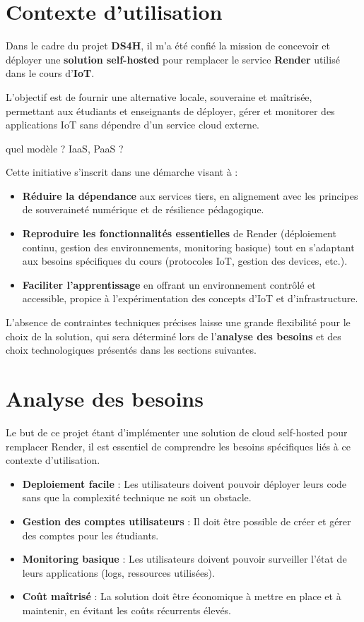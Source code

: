 \documentclass{rapportClass} %
\begin{document}
\section{Contexte d'utilisation} %
Dans le cadre du projet \textbf{DS4H}, il m'a été confié la mission de
concevoir et déployer une \textbf{solution self-hosted} pour remplacer
le service \textbf{Render} utilisé dans le cours d’\textbf{IoT}.

L’objectif est de fournir une alternative locale, souveraine et
maîtrisée, permettant aux étudiants et enseignants de déployer, gérer
et monitorer des applications IoT sans dépendre d’un service cloud
externe.

{\color{red} quel modèle ? IaaS, PaaS ?}


Cette initiative s’inscrit dans une démarche visant à :
\begin{itemize}
\item \textbf{Réduire la dépendance} aux services tiers, en alignement
  avec les principes de souveraineté numérique et de résilience
  pédagogique.
\item \textbf{Reproduire les fonctionnalités essentielles} de Render
  (déploiement continu, gestion des environnements, monitoring
  basique) tout en s’adaptant aux besoins spécifiques du cours
  (protocoles IoT, gestion des devices, etc.).
\item \textbf{Faciliter l’apprentissage} en offrant un environnement
  contrôlé et accessible, propice à l’expérimentation des concepts
  d’IoT et d’infrastructure.
\end{itemize}


L’absence de contraintes techniques précises laisse une grande
flexibilité pour le choix de la solution, qui sera déterminé lors de
l’\textbf{analyse des besoins} et des choix technologiques présentés
dans les sections suivantes.


\section{Analyse des besoins}
Le but de ce projet étant d'implémenter une solution de cloud
self-hosted pour remplacer Render, il est essentiel de comprendre les
besoins spécifiques liés à ce contexte d’utilisation.
\begin{itemize}
    \item \textbf{Deploiement facile} : Les utilisateurs doivent pouvoir déployer leurs code sans que la complexité technique ne soit un obstacle.
    \item \textbf{Gestion des comptes utilisateurs} : Il doit être possible de créer et gérer des comptes pour les étudiants.
    \item \textbf{Monitoring basique} : Les utilisateurs doivent pouvoir surveiller l’état de leurs applications (logs, ressources utilisées).
    \item \textbf{Coût maîtrisé} : La solution doit être économique à mettre en place et à maintenir, en évitant les coûts récurrents élevés.
\end{itemize}
\end{document}
